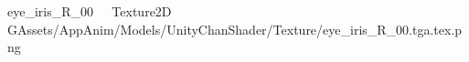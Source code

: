 
   eye_iris_R_00            	   Texture2D
   G   Assets/AppAnim/Models/UnityChanShader/Texture/eye_iris_R_00.tga.tex.png